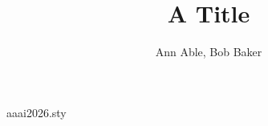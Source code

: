 \begin{filecontents*}[overwrite]{aaai2026.sty}
\def\maketitle{\par\begingroup\def\thefootnote{\fndag}\twocolumn[\@maketitle]\@thanks\endgroup
  \setcounter{footnote}{0}\let\maketitle\relax\let\@maketitle\relax
  \gdef\@thanks{}\gdef\@author{}\gdef\@title{}\let\thanks\relax}
\def\@maketitle{\newcounter{eqfn}\setcounter{eqfn}{0}%
  \vbox{\let\footnote\thanks\relax\setcounter{footnote}{0}%
    \def\equalcontrib{\ifnum\value{eqfn}=0 \footnote{These authors contributed equally.}%
      \setcounter{eqfn}{\value{footnote}}\else\footnotemark[\value{eqfn}]\fi}%
    \hsize\textwidth\centering{\LARGE\bf\@title\par}\vskip 1em{\Large\bf\@author\par}}}
\def\fndag{†}
\end{filecontents*}
\documentclass{article}
\usepackage{aaai2026}
\title{A Title}
\author{Ann Able\equalcontrib, Bob Baker\equalcontrib}

\maketitle
Body.

